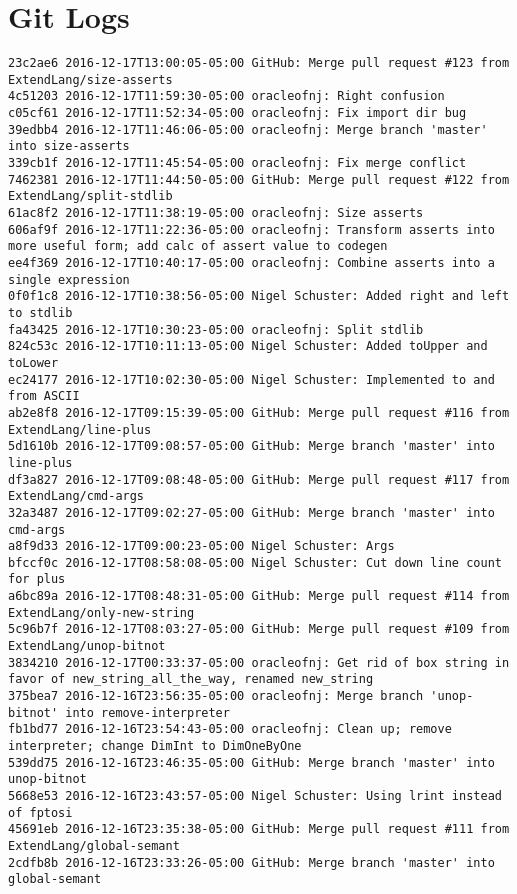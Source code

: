 \medskip \noindent
\chapter{Git Logs}
\begin{lstlisting}
23c2ae6 2016-12-17T13:00:05-05:00 GitHub: Merge pull request #123 from ExtendLang/size-asserts
4c51203 2016-12-17T11:59:30-05:00 oracleofnj: Right confusion
c05cf61 2016-12-17T11:52:34-05:00 oracleofnj: Fix import dir bug
39edbb4 2016-12-17T11:46:06-05:00 oracleofnj: Merge branch 'master' into size-asserts
339cb1f 2016-12-17T11:45:54-05:00 oracleofnj: Fix merge conflict
7462381 2016-12-17T11:44:50-05:00 GitHub: Merge pull request #122 from ExtendLang/split-stdlib
61ac8f2 2016-12-17T11:38:19-05:00 oracleofnj: Size asserts
606af9f 2016-12-17T11:22:36-05:00 oracleofnj: Transform asserts into more useful form; add calc of assert value to codegen
ee4f369 2016-12-17T10:40:17-05:00 oracleofnj: Combine asserts into a single expression
0f0f1c8 2016-12-17T10:38:56-05:00 Nigel Schuster: Added right and left to stdlib
fa43425 2016-12-17T10:30:23-05:00 oracleofnj: Split stdlib
824c53c 2016-12-17T10:11:13-05:00 Nigel Schuster: Added toUpper and toLower
ec24177 2016-12-17T10:02:30-05:00 Nigel Schuster: Implemented to and from ASCII
ab2e8f8 2016-12-17T09:15:39-05:00 GitHub: Merge pull request #116 from ExtendLang/line-plus
5d1610b 2016-12-17T09:08:57-05:00 GitHub: Merge branch 'master' into line-plus
df3a827 2016-12-17T09:08:48-05:00 GitHub: Merge pull request #117 from ExtendLang/cmd-args
32a3487 2016-12-17T09:02:27-05:00 GitHub: Merge branch 'master' into cmd-args
a8f9d33 2016-12-17T09:00:23-05:00 Nigel Schuster: Args
bfccf0c 2016-12-17T08:58:08-05:00 Nigel Schuster: Cut down line count for plus
a6bc89a 2016-12-17T08:48:31-05:00 GitHub: Merge pull request #114 from ExtendLang/only-new-string
5c96b7f 2016-12-17T08:03:27-05:00 GitHub: Merge pull request #109 from ExtendLang/unop-bitnot
3834210 2016-12-17T00:33:37-05:00 oracleofnj: Get rid of box string in favor of new_string_all_the_way, renamed new_string
375bea7 2016-12-16T23:56:35-05:00 oracleofnj: Merge branch 'unop-bitnot' into remove-interpreter
fb1bd77 2016-12-16T23:54:43-05:00 oracleofnj: Clean up; remove interpreter; change DimInt to DimOneByOne
539dd75 2016-12-16T23:46:35-05:00 GitHub: Merge branch 'master' into unop-bitnot
5668e53 2016-12-16T23:43:57-05:00 Nigel Schuster: Using lrint instead of fptosi
45691eb 2016-12-16T23:35:38-05:00 GitHub: Merge pull request #111 from ExtendLang/global-semant
2cdfb8b 2016-12-16T23:33:26-05:00 GitHub: Merge branch 'master' into global-semant

\end{lstlisting}
